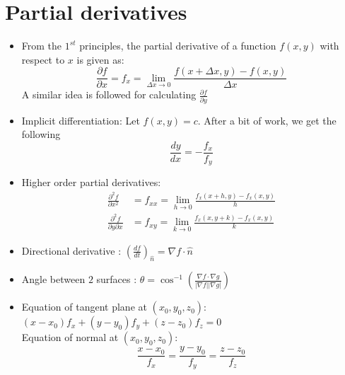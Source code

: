 \documentclass[a4paper]{article}
\begin{document}
\section{Partial derivatives}
\begin{itemize}
    \item From the $1^{st}$ principles, the partial derivative of a function $f(x,y)$ with respect to $x$ is given as:
    \begin{equation*}
        \frac{\partial f}{\partial x} = f_x = \lim_{\Delta x \to 0} \frac{f(x+\Delta x,y)-f(x,y)}{\Delta x}
    \end{equation*}
    A similar idea is followed for  calculating $\frac{\partial f}{\partial y}$
    
    \item Implicit differentiation: Let $f(x,y) = c$. After a bit of work, we get the following
    \begin{equation*}
        \frac{dy}{dx} = -\frac{f_x}{f_y} 
    \end{equation*}
    
    \item Higher order partial derivatives:
    \begin{align*}
        \frac{\partial^2 f}{\partial x^2} &= f_{xx} = \lim_{h \to 0} \frac{f_x(x+h,y)-f_x(x,y)}{h}\\
        \frac{\partial^2 f}{\partial y\partial x} &= f_{xy} = \lim_{k\to 0} \frac{f_x(x,y+k)-f_x(x,y)}{k}
    \end{align*}
    
    \item Directional derivative : $\left(\frac{df}{dt}\right)_{\hat{n}} = \nabla f\cdot\hat{n}$
    \item Angle between $2$ surfaces : $\theta = \cos^{-1}{\left(\frac{\nabla f\cdot\nabla g}{|\nabla f||\nabla g|}\right)}$
    \item Equation of tangent plane at $(x_0,y_0,z_0)$: $(x-x_0)f_x+(y-y_0)f_y+(z-z_0)f_z=0$\\
    Equation of normal at $(x_0,y_0,z_0)$:
    \begin{equation*}
        \frac{x-x_0}{f_x} = \frac{y-y_0}{f_y} = \frac{z-z_0}{f_z}
    \end{equation*}
    

\end{itemize}
\end{document}
